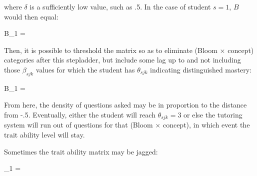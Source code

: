 where $\delta$ is a sufficiently low value, such as .5.  In the case of
student $s=1$, $B$ would then equal:

\begin{equations}
B_1 =
\end{equations}
\vspace{12pt}

Then, it is possible to threshold the matrix so as to eliminate (Bloom $\times$
concept) categories after this stepladder, but include some lag up to and not
including those $\beta_{sjk}$ values for which the student has $\theta_{sjk}$
indicating distinguished mastery:

\begin{equations}
B_1 =
\end{equations}
\vspace{12pt}

From here, the density of questions asked may be in proportion to the distance
from -.5.  Eventually, either the student will reach $\theta_{sjk} = 3$ or else
the tutoring system will run out of questions for that (Bloom $\times$
concept), in which event the trait ability level will stay.

Sometimes the trait ability matrix may be jagged:

\begin{equations}
\Theta_1 =
\end{equations}
\vspace{12pt}

